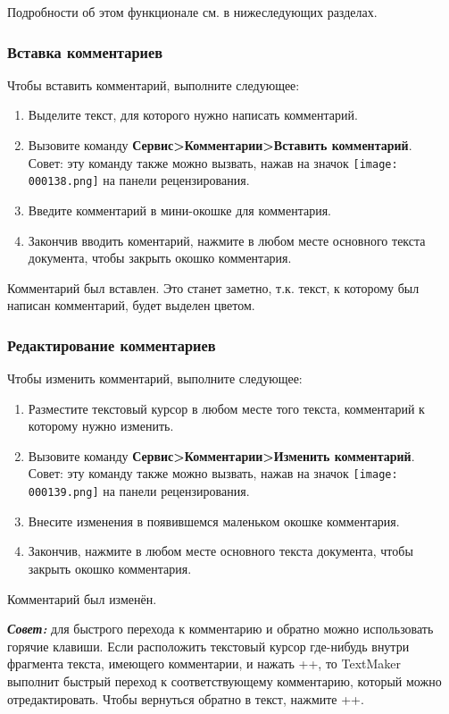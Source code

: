 ﻿\documentclass[a4paper,10pt]{article}
\begin{document}
Подробности об этом функционале см. в нижеследующих разделах.

\subsubsection{Вставка комментариев}
Чтобы вставить комментарий, выполните следующее:
\begin{enumerate}
 \item Выделите текст, для которого нужно написать комментарий.
 \item Вызовите команду \textbf{Сервис>Комментарии>Вставить комментарий}.\\
 Совет: эту команду также можно вызвать, нажав на значок \texttt{[image: 000138.png]} на панели рецензирования.
 \item Введите комментарий в мини-окошке для комментария.
 \item Закончив вводить коментарий, нажмите в любом месте основного текста документа, чтобы закрыть окошко комментария.
 \end{enumerate}
 
 Комментарий был вставлен. Это станет заметно, т.к. текст, к которому был написан комментарий, будет выделен цветом.

\subsubsection{Редактирование комментариев}
Чтобы изменить комментарий, выполните следующее:
\begin{enumerate}
 \item Разместите текстовый курсор в любом месте того текста, комментарий к которому нужно изменить.
 \item Вызовите команду \textbf{Сервис>Комментарии>Изменить комментарий}.\\
 Совет: эту команду также можно вызвать, нажав на значок \texttt{[image: 000139.png]} на панели рецензирования.
 \item Внесите изменения в появившемся маленьком окошке комментария.
 \item Закончив, нажмите в любом месте основного текста документа, чтобы закрыть окошко комментария.
\end{enumerate}

Комментарий был изменён.

\begin{mdframed}[backgroundcolor=blue!10]
\textbf{\textit{Совет:}} для быстрого перехода к комментарию и обратно можно использовать горячие клавиши. Если расположить текстовый курсор где-нибудь внутри фрагмента текста, имеющего комментарии, и нажать ++\keys{\arrowkeydown}, то TextMaker выполнит быстрый переход к соответствующему комментарию, который можно отредактировать. Чтобы вернуться обратно в текст, нажмите ++\keys{\arrowkeyup}.
\end{mdframed}
\end{document}
